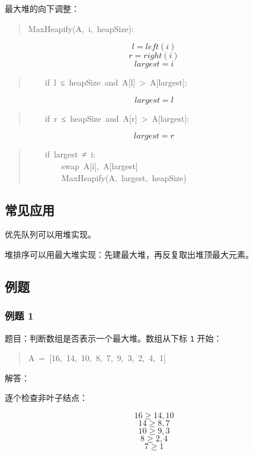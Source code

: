 \documentclass[UTF8,zihao=-4]{ctexart}
\begin{document}
最大堆的向下调整：

\begin{quote}
\small\ttfamily\raggedright
\relax MaxHeapify(A,\ i,\ heapSize):\\
\end{quote}
\[l = left(i)\]
\[r = right(i)\]
\[largest = i\]
\begin{quote}
\small\ttfamily\raggedright
\relax \ \ \ \ if\ l\ ≤\ heapSize\ and\ A[l]\ >\ A[largest]:\\
\end{quote}
\[largest = l\]
\begin{quote}
\small\ttfamily\raggedright
\relax \ \ \ \ if\ r\ ≤\ heapSize\ and\ A[r]\ >\ A[largest]:\\
\end{quote}
\[largest = r\]
\begin{quote}
\small\ttfamily\raggedright
\relax \ \ \ \ if\ largest\ ≠\ i:\\
\relax \ \ \ \ \ \ \ \ swap\ A[i],\ A[largest]\\
\relax \ \ \ \ \ \ \ \ MaxHeapify(A,\ largest,\ heapSize)\\
\end{quote}

\subsection*{常见应用}

优先队列可以用堆实现。

堆排序可以用最大堆实现：先建最大堆，再反复取出堆顶最大元素。

\subsection*{例题}

\subsubsection*{例题 1}

题目：判断数组是否表示一个最大堆。数组从下标 \texttt{1} 开始：

\begin{quote}
\small\ttfamily\raggedright
\relax A\ =\ [16,\ 14,\ 10,\ 8,\ 7,\ 9,\ 3,\ 2,\ 4,\ 1]\\
\end{quote}

解答：

逐个检查非叶子结点：

\[16 \ge  14, 10\]
\[14 \ge  8, 7\]
\[10 \ge  9, 3\]
\[8 \ge  2, 4\]
\[7 \ge  1\]
\end{document}
